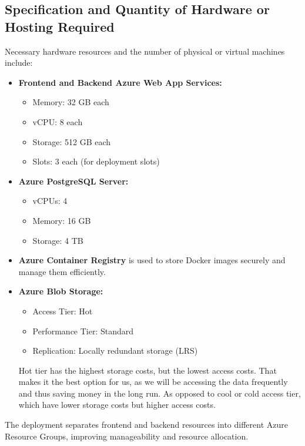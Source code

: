 \subsection{Specification and Quantity of Hardware or Hosting Required}
Necessary hardware resources and the number of physical or virtual machines include:
\begin{itemize}
    \item \textbf{Frontend and Backend Azure Web App Services:}
    \begin{itemize}
        \item Memory: 32 GB each
        \item vCPU: 8 each
        \item Storage: 512 GB each
        \item Slots: 3 each (for deployment slots)
    \end{itemize}
    \item \textbf{Azure PostgreSQL Server:}
    \begin{itemize}
        \item vCPUs: 4
        \item Memory: 16 GB
        \item Storage: 4 TB
    \end{itemize}
    \item \textbf{Azure Container Registry} is used to store Docker images securely and manage them efficiently.
    \item \textbf{Azure Blob Storage:}
    \begin{itemize}
        \item Access Tier: Hot
        \item Performance Tier: Standard
        \item Replication: Locally redundant storage (LRS)
    \end{itemize}
    Hot tier has the highest storage costs, but the lowest access costs. That makes it the best option for us, as we will be accessing the data frequently and thus saving money in the long run. As opposed to cool or cold access tier, which have lower storage costs but higher access costs.
\end{itemize}
The deployment separates frontend and backend resources into different Azure Resource Groups, improving manageability and resource allocation.

